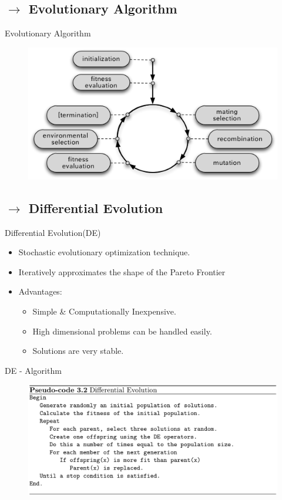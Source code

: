 \documentclass[10pt]{beamer}
\begin{document}
\subsection{$\rightarrow$ Evolutionary Algorithm}
\begin{frame}{Evolutionary Algorithm}
    \begin{figure}
    \centering
    \includegraphics[width=\linewidth]{figures/evo_algo}
    \label{fig:evo_algo}
    \end{figure}
\end{frame}
\subsection{$\rightarrow$ Differential Evolution}
\begin{frame}{Differential Evolution(DE)}
    \begin{itemize}
    \item<1-> Stochastic evolutionary optimization technique.
    \item<2-> Iteratively approximates the shape of the Pareto Frontier
    \item<3-> Advantages:
    \begin{itemize}
        \item<3-> Simple \& Computationally Inexpensive.
        \item<3-> High dimensional problems can be handled easily.
        \item<3-> Solutions are very stable.
    \end{itemize}
    \end{itemize}
\end{frame}
\begin{frame}{DE - Algorithm}
    \begin{figure}
    \centering
    \includegraphics[width=\linewidth]{figures/DE_pseudocode}
    \label{fig:de_pseudocode}
    \end{figure}
\end{frame}
\end{document}
